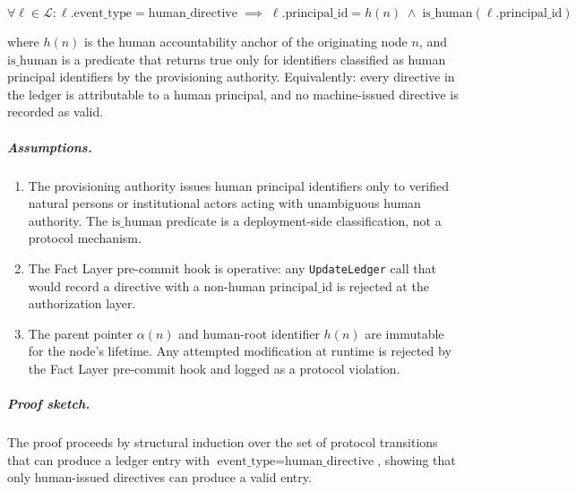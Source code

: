 \begin{equation}
\forall \ell \in \mathcal{L} : \ell.\text{event\_type} = \text{human\_directive}
\;\implies\;
\ell.\text{principal\_id} = h(n)
\;\land\;
\text{is\_human}(\ell.\text{principal\_id})
\end{equation}

where $h(n)$ is the human accountability anchor of the originating node $n$, and $\text{is\_human}$ is a predicate that returns true only for identifiers classified as human principal identifiers by the provisioning authority. Equivalently: every directive in the ledger is attributable to a human principal, and no machine-issued directive is recorded as valid.

\subparagraph{Assumptions.}
\begin{enumerate}
\item[\textbf{A3.1}] The provisioning authority issues human principal identifiers only to verified natural persons or institutional actors acting with unambiguous human authority. The $\text{is\_human}$ predicate is a deployment-side classification, not a protocol mechanism.
\item[\textbf{A3.2}] The Fact Layer pre-commit hook is operative: any \texttt{UpdateLedger} call that would record a directive with a non-human $\text{principal\_id}$ is rejected at the authorization layer.
\item[\textbf{A3.3}] The parent pointer $\alpha(n)$ and human-root identifier $h(n)$ are immutable for the node's lifetime. Any attempted modification at runtime is rejected by the Fact Layer pre-commit hook and logged as a protocol violation.
\end{enumerate}

\subparagraph{Proof sketch.} The proof proceeds by structural induction over the set of protocol transitions that can produce a ledger entry with $\text{event\_type} = \text{human\_directive}$, showing that only human-issued directives can produce a valid entry.

